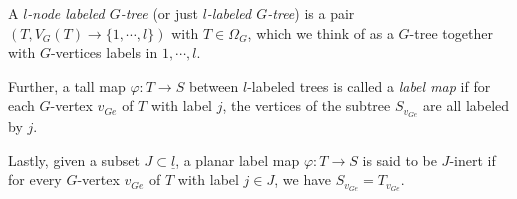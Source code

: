 \documentclass[a4paper,10pt]{article}%
\begin{document}
\begin{definition}\label{LABMAP DEF}
A \textit{$l$-node labeled $G$-tree} (or just \textit{$l$-labeled $G$-tree}) is a pair $(T,V_G(T) \to \{1,\cdots,l\})$ with $T \in \Omega_G$, which we think of as a $G$-tree together with $G$-vertices labels in $1,\cdots,l$.

Further, a tall map $\varphi \colon T \to S$ between $l$-labeled trees is called a \textit{label map} if for each $G$-vertex $v_{G e}$ of $T$ with label $j$, the vertices of the subtree $S_{v_{G e}}$ are all labeled by $j$.

Lastly, given a subset $J\subset \underline{l}$, a planar label map $\varphi \colon T \to S$ is said to be $J$-inert if for every $G$-vertex $v_{G e}$ of $T$ with label $j \in J$, we have $S_{v_{Ge}} = T_{v_{Ge}}$.
\end{definition}
\end{document}
